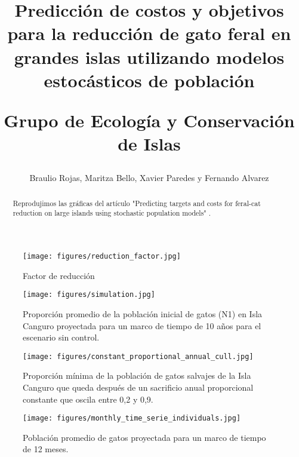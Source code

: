 \documentclass{article} %
\author{Braulio Rojas, Maritza Bello, Xavier Paredes y Fernando Alvarez}
\title{Predicción de costos y objetivos para la reducción de gato feral en grandes islas utilizando modelos estocásticos de población \\ \begin{large} Grupo de Ecología y Conservación de Islas \end{large}}
\begin{document}
\maketitle

\begin{abstract}

Reprodujimos las gráficas del artículo "Predicting targets and costs for feral-cat reduction on large islands using stochastic population models" \cite{venning2021predicting}.

\end{abstract}


\begin{figure}[H]
    \centering
\texttt{[image: figures/reduction\_factor.jpg]}
\caption{Factor de reducción}
\label{fig:reductionFactor}
\end{figure}

\begin{figure}[H]
    \centering
\texttt{[image: figures/simulation.jpg]}
\caption{Proporción promedio de la población inicial de gatos (N1) en Isla Canguro proyectada para un marco de tiempo de 10 años para el escenario sin control.}
\label{fig:simulation}
\end{figure}

\begin{figure}[H]
    \centering
\texttt{[image: figures/constant\_proportional\_annual\_cull.jpg]}
\caption{Proporción mínima de la población de gatos salvajes de la Isla Canguro que queda después de un sacrificio anual proporcional constante que oscila entre 0,2 y 0,9.}
\label{fig:constantProportionalAnnualCull}
\end{figure}

\begin{figure}[H]
    \centering
\texttt{[image: figures/monthly\_time\_serie\_individuals.jpg]}
\caption{Población promedio de gatos proyectada para un marco de tiempo de 12 meses.}
\label{fig:monthlyTimeSerieIndividuals}
\end{figure}



\end{document}
